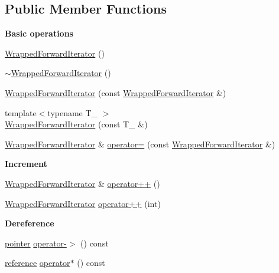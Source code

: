 \subsection*{Public Member Functions}
\begin{Indent}{\bf Basic operations}\par
{\em \label{_amgrp975c17051b7ca0881996227cb36eab7b}
 }\begin{DoxyCompactItemize}
\item 
\hyperlink{classeos_1_1WrappedForwardIterator_a321ac3c98ae28956b7428b193e6f65ba}{WrappedForwardIterator} ()
\item 
\hyperlink{classeos_1_1WrappedForwardIterator_a4694e3a609d50263eff28cf49c6359c0}{$\sim$WrappedForwardIterator} ()
\item 
\hyperlink{classeos_1_1WrappedForwardIterator_af824e052467ced345fdc2391bf251e34}{WrappedForwardIterator} (const \hyperlink{classeos_1_1WrappedForwardIterator}{WrappedForwardIterator} \&)
\item 
{\footnotesize template$<$typename T\_\- $>$ }\\\hyperlink{classeos_1_1WrappedForwardIterator_a35ef424f724996a9cc6ac3d8513fefa5}{WrappedForwardIterator} (const T\_\- \&)
\item 
\hyperlink{classeos_1_1WrappedForwardIterator}{WrappedForwardIterator} \& \hyperlink{classeos_1_1WrappedForwardIterator_a73f420f7f9bcc8bf8ad1286f7d5f9601}{operator=} (const \hyperlink{classeos_1_1WrappedForwardIterator}{WrappedForwardIterator} \&)
\end{DoxyCompactItemize}
\end{Indent}
\begin{Indent}{\bf Increment}\par
{\em \label{_amgrp6f15bdfa71aa83b0d197cad75757d580}
 }\begin{DoxyCompactItemize}
\item 
\hyperlink{classeos_1_1WrappedForwardIterator}{WrappedForwardIterator} \& \hyperlink{classeos_1_1WrappedForwardIterator_a553cd24e60c32710a09912f446213833}{operator++} ()
\item 
\hyperlink{classeos_1_1WrappedForwardIterator}{WrappedForwardIterator} \hyperlink{classeos_1_1WrappedForwardIterator_a34a30fd266a0f1c8610dd0b354c4dd21}{operator++} (int)
\end{DoxyCompactItemize}
\end{Indent}
\begin{Indent}{\bf Dereference}\par
{\em \label{_amgrp106e561b2e17ce87f3ff681efa40f1dc}
 }\begin{DoxyCompactItemize}
\item 
\hyperlink{classeos_1_1WrappedForwardIterator_addb7c63e8b8d4be0a65ded32a4cb7cb9}{pointer} \hyperlink{classeos_1_1WrappedForwardIterator_af12c608415c6ee323ca93834486fc2b7}{operator-\/$>$} () const 
\item 
\hyperlink{classeos_1_1WrappedForwardIterator_ac7ba4ace12142ac73d97df5d555a4c18}{reference} \hyperlink{classeos_1_1WrappedForwardIterator_ae02a50270f0a0fc3ccae98a41c2d144c}{operator$\ast$} () const 
\end{DoxyCompactItemize}
\end{Indent}

